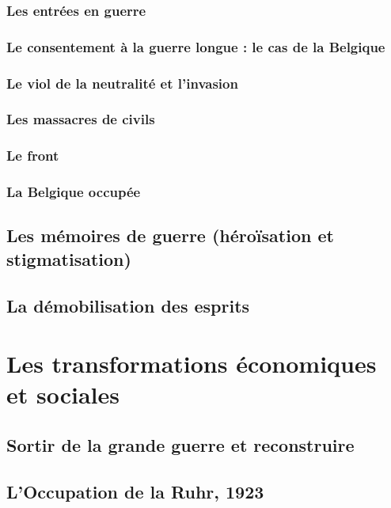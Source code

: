 \documentclass[12pt]{report}
\begin{document}
\subsection{Les entrées en guerre}

\subsection{Le consentement à la guerre longue : le cas de la Belgique}

\subsection{Le viol de la neutralité et l'invasion}

\subsection{Les massacres de civils}

\subsection{Le front}

\subsection{La Belgique occupée}

\section{Les mémoires de guerre (héroïsation et stigmatisation)}

\section{La démobilisation des esprits}

\chapter{Les transformations économiques et sociales}

\section{Sortir de la grande guerre et reconstruire}

\section{L'Occupation de la Ruhr, 1923}
\end{document}
